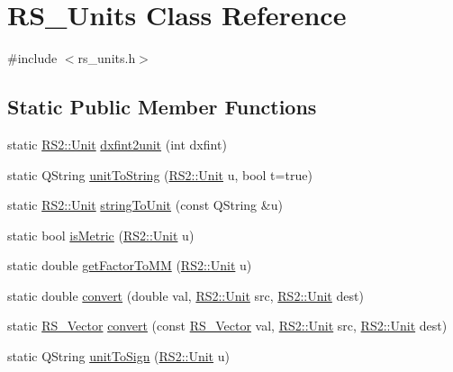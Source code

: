 \hypertarget{classRS__Units}{\section{R\-S\-\_\-\-Units Class Reference}
\label{classRS__Units}
}


{\ttfamily \#include $<$rs\-\_\-units.\-h$>$}

\subsection*{Static Public Member Functions}
\begin{DoxyCompactItemize}
\item 
static \hyperlink{classRS2_ad859751df6978737e4f35ec111ff9828}{R\-S2\-::\-Unit} \hyperlink{classRS__Units_a11d2b29f6f51e740f3f093cb27e3f23f}{dxfint2unit} (int dxfint)
\item 
static Q\-String \hyperlink{classRS__Units_a4a5b96d80f2292a5c9b2db9d351b1194}{unit\-To\-String} (\hyperlink{classRS2_ad859751df6978737e4f35ec111ff9828}{R\-S2\-::\-Unit} u, bool t=true)
\item 
static \hyperlink{classRS2_ad859751df6978737e4f35ec111ff9828}{R\-S2\-::\-Unit} \hyperlink{classRS__Units_a192dcc1011b50ad5fea11320b4c3480b}{string\-To\-Unit} (const Q\-String \&u)
\item 
static bool \hyperlink{classRS__Units_ac4e933d8888c02e69dc87954800a8b91}{is\-Metric} (\hyperlink{classRS2_ad859751df6978737e4f35ec111ff9828}{R\-S2\-::\-Unit} u)
\item 
static double \hyperlink{classRS__Units_adf5765cbead5bbb3087a6ef666feedb4}{get\-Factor\-To\-M\-M} (\hyperlink{classRS2_ad859751df6978737e4f35ec111ff9828}{R\-S2\-::\-Unit} u)
\item 
static double \hyperlink{classRS__Units_a66319fe4b641ce38adda06b25b4c9c34}{convert} (double val, \hyperlink{classRS2_ad859751df6978737e4f35ec111ff9828}{R\-S2\-::\-Unit} src, \hyperlink{classRS2_ad859751df6978737e4f35ec111ff9828}{R\-S2\-::\-Unit} dest)
\item 
static \hyperlink{classRS__Vector}{R\-S\-\_\-\-Vector} \hyperlink{classRS__Units_aaf734555e3ce8715322ad6cbfa5dbc8b}{convert} (const \hyperlink{classRS__Vector}{R\-S\-\_\-\-Vector} val, \hyperlink{classRS2_ad859751df6978737e4f35ec111ff9828}{R\-S2\-::\-Unit} src, \hyperlink{classRS2_ad859751df6978737e4f35ec111ff9828}{R\-S2\-::\-Unit} dest)
\item 
static Q\-String \hyperlink{classRS__Units_a162a187293370ff69f18e3beabbc5888}{unit\-To\-Sign} (\hyperlink{classRS2_ad859751df6978737e4f35ec111ff9828}{R\-S2\-::\-Unit} u)

\end{DoxyCompactItemize}
